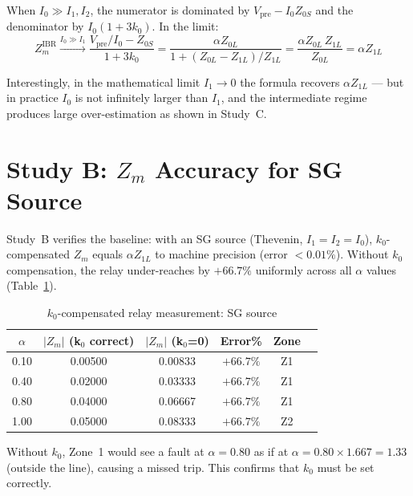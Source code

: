 \documentclass[11pt,a4paper]{article}
\begin{document}
When $I_0 \gg I_1, I_2$, the numerator is dominated by $V_\mathrm{pre} - I_0 Z_{0S}$
and the denominator by $I_0(1+3k_0)$.  In the limit:
\begin{equation}
  Z_m^{\mathrm{IBR}} \xrightarrow{I_0\gg I_1}
  \frac{V_\mathrm{pre}/I_0 - Z_{0S}}{1 + 3k_0}
  = \frac{\alpha Z_{0L}}{1 + (Z_{0L}-Z_{1L})/Z_{1L}}
  = \frac{\alpha Z_{0L}\, Z_{1L}}{Z_{0L}}
  = \alpha Z_{1L}
  \label{eq:zm_ibr_limit}
\end{equation}

Interestingly, in the mathematical limit $I_1\to 0$ the formula recovers
$\alpha Z_{1L}$ --- but in practice $I_0$ is not infinitely larger than $I_1$,
and the intermediate regime produces large over-estimation as shown in
Study~C.

\section{Study B: $Z_m$ Accuracy for SG Source}
\label{sec:study_b}

Study~B verifies the baseline: with an SG source (Thevenin, $I_1=I_2=I_0$),
$k_0$-compensated $Z_m$ equals $\alpha Z_{1L}$ to machine precision (error $<0.01\%$).
Without $k_0$ compensation, the relay under-reaches by $+66.7\%$ uniformly across
all $\alpha$ values (Table~\ref{tab:zm_accuracy}).

\begin{table}[h]
\centering
\caption{$k_0$-compensated relay measurement: SG source}
\label{tab:zm_accuracy}
\begin{tabular}{@{}cccccl@{}}
\toprule
$\alpha$ & $|Z_m|$ (k$_0$ correct) & $|Z_m|$ (k$_0$=0) & Error\% & Zone \\
\midrule
0.10 & 0.00500 & 0.00833 & $+66.7\%$ & Z1 \\
0.40 & 0.02000 & 0.03333 & $+66.7\%$ & Z1 \\
0.80 & 0.04000 & 0.06667 & $+66.7\%$ & Z1 \\
1.00 & 0.05000 & 0.08333 & $+66.7\%$ & Z2 \\
\bottomrule
\end{tabular}
\end{table}

Without $k_0$, Zone~1 would see a fault at $\alpha=0.80$ as if at
$\alpha=0.80\times 1.667 = 1.33$ (outside the line), causing a missed trip.
This confirms that $k_0$ must be set correctly.
\end{document}
